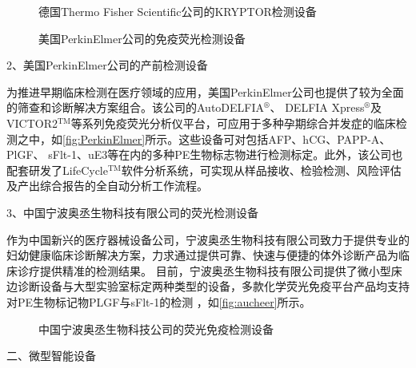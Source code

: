 \begin{figure}[htbp]
    \centering
    \quad
    \caption{\label{fig:B·R·A·H·M·S}德国Thermo Fisher Scientific公司的KRYPTOR检测设备}
\end{figure}
\vspace{1cm}
\begin{figure}[htbp]
    \centering
    \quad
    \caption{\label{fig:PerkinElmer}美国PerkinElmer公司的免疫荧光检测设备}
\end{figure}
\vspace{1cm}

2、美国PerkinElmer公司的产前检测设备

为推进早期临床检测在医疗领域的应用，美国PerkinElmer公司也提供了较为全面的筛查和诊断解决方案组合\cite{perkinelmer2023}。该公司的AutoDELFIA$^\circledR$、
DELFIA Xpress$^\circledR$及VICTOR2$^\text{TM}$等系列免疫荧光分析仪平台，可应用于多种孕期综合并发症的临床检测之中，如\autoref{fig:PerkinElmer}所示。这些设备可对包括AFP、hCG、PAPP-A、PlGF、
sFlt-1、uE3等在内的多种PE生物标志物进行检测标定。此外，该公司也配套研发了LifeCycle$^\text{TM}$软件分析系统，可实现从样品接收、检验检测、风险评估及产出综合报告的全自动分析工作流程。

3、中国宁波奥丞生物科技有限公司的荧光检测设备

作为中国新兴的医疗器械设备公司，宁波奥丞生物科技有限公司致力于提供专业的妇幼健康临床诊断解决方案，力求通过提供可靠、快速与便捷的体外诊断产品为临床诊疗提供精准的检测结果。
目前，宁波奥丞生物科技有限公司提供了微小型床边诊断设备与大型实验室标定两种类型的设备，多款化学荧光免疫平台产品均支持对PE生物标记物PLGF与sFlt-1的检测
，如\autoref{fig:aucheer}所示\cite{aucheer2023}。
\begin{figure}[h]
    \centering
    \quad
    \caption{\label{fig:aucheer}中国宁波奥丞生物科技公司的荧光免疫检测设备}
\end{figure}

二、微型智能设备


